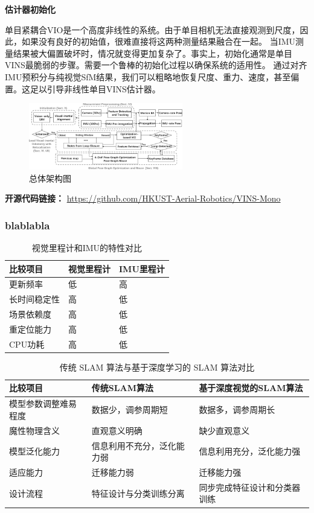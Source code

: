 \documentclass[cs4size,a4paper]{ctexart}
\numberwithin{equation}{section}
\numberwithin{table}{section}
\numberwithin{figure}{section}
\begin{document}
\textbf{估计器初始化}

单目紧耦合VIO是一个高度非线性的系统。由于单目相机无法直接观测到尺度，因此，如果没有良好的初始值，很难直接将这两种测量结果融合在一起。
当IMU测量结果被大偏置破坏时，情况就变得更加复杂了。事实上，初始化通常是单目VINS最脆弱的步骤。需要一个鲁棒的初始化过程以确保系统的适用性。
通过对齐IMU预积分与纯视觉SfM结果，我们可以粗略地恢复尺度、重力、速度，甚至偏置。这足以引导非线性单目VINS估计器。

\begin{figure}[H]
        \centering
        \includegraphics[width=0.6\textwidth]{figure/vins2.png}
        \caption{总体架构图}
\end{figure}

\textbf{开源代码链接：}
\url{https://github.com/HKUST-Aerial-Robotics/VINS-Mono}

\subsubsection{blablabla}
\begin{table}[H]
        \centering
        \begin{tabular}{l|ll}
        \toprule
        比较项目   &视觉里程计 & IMU里程计\\
        \midrule[2pt]
        更新频率 & 低    & 高\\
        长时间稳定性 & 高   & 低\\
        场景依赖度 & 高  &  低\\
        重定位能力 &  高  & 低\\
        CPU功耗 &  高 & 低\\
        \bottomrule
        \end{tabular}
        \caption{视觉里程计和IMU的特性对比}
\end{table}
\begin{table}[H]
        \centering
        \begin{tabular}{l|ll}
        \toprule
        比较项目   &传统SLAM算法 & 基于深度视觉的SLAM算法\\
        \midrule[2pt]
        模型参数调整难易程度 & 数据少，调参周期短    & 数据多，调参周期长\\
        魔性物理含义 & 直观意义明确   & 缺少直观意义\\
        模型泛化能力 & 信息利用不充分，泛化能力弱  &  信息利用充分，泛化能力强\\
        适应能力 &  迁移能力弱  & 迁移能力强\\
        设计流程 &  特征设计与分类训练分离 & 同步完成特征设计和分类器训练\\
        \bottomrule
        \end{tabular}
        \caption{传统 SLAM 算法与基于深度学习的 SLAM 算法对比\cite{ZHAOYang:889}}
\end{table}
\end{document}
